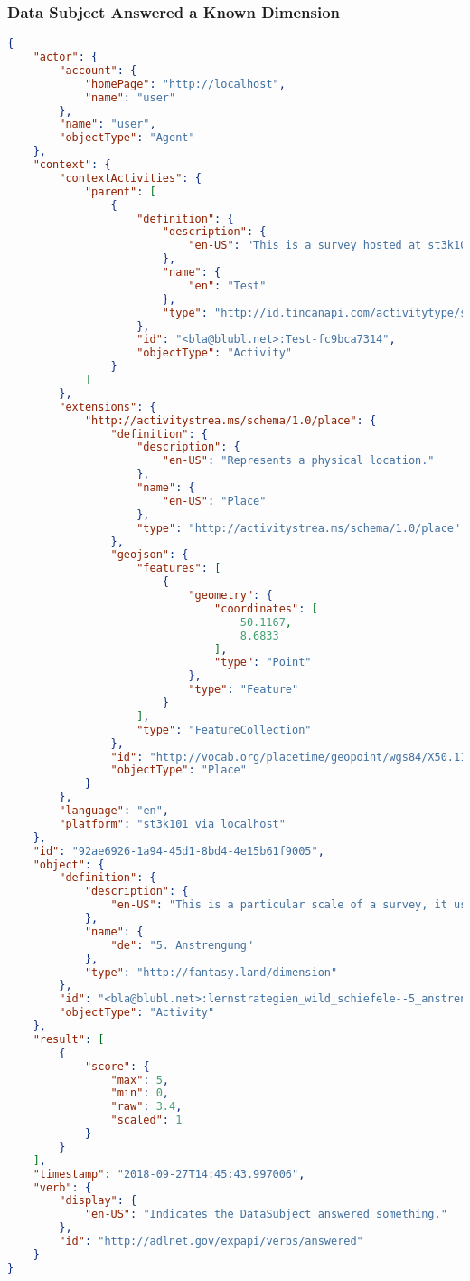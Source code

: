 \subsubsection*{Data Subject Answered a Known Dimension}
\begin{lstlisting}[language=JSON]
{
    "actor": {
        "account": {
            "homePage": "http://localhost",
            "name": "user"
        },
        "name": "user",
        "objectType": "Agent"
    },
    "context": {
        "contextActivities": {
            "parent": [
                {
                    "definition": {
                        "description": {
                            "en-US": "This is a survey hosted at st3k101."
                        },
                        "name": {
                            "en": "Test"
                        },
                        "type": "http://id.tincanapi.com/activitytype/survey"
                    },
                    "id": "<bla@blubl.net>:Test-fc9bca7314",
                    "objectType": "Activity"
                }
            ]
        },
        "extensions": {
            "http://activitystrea.ms/schema/1.0/place": {
                "definition": {
                    "description": {
                        "en-US": "Represents a physical location."
                    },
                    "name": {
                        "en-US": "Place"
                    },
                    "type": "http://activitystrea.ms/schema/1.0/place"
                },
                "geojson": {
                    "features": [
                        {
                            "geometry": {
                                "coordinates": [
                                    50.1167,
                                    8.6833
                                ],
                                "type": "Point"
                            },
                            "type": "Feature"
                        }
                    ],
                    "type": "FeatureCollection"
                },
                "id": "http://vocab.org/placetime/geopoint/wgs84/X50.1167Y8.6833.html",
                "objectType": "Place"
            }
        },
        "language": "en",
        "platform": "st3k101 via localhost"
    },
    "id": "92ae6926-1a94-45d1-8bd4-4e15b61f9005",
    "object": {
        "definition": {
            "description": {
                "en-US": "This is a particular scale of a survey, it usually contains multiple questions."
            },
            "name": {
                "de": "5. Anstrengung"
            },
            "type": "http://fantasy.land/dimension"
        },
        "id": "<bla@blubl.net>:lernstrategien_wild_schiefele--5_anstrengung",
        "objectType": "Activity"
    },
    "result": [
        {
            "score": {
                "max": 5,
                "min": 0,
                "raw": 3.4,
                "scaled": 1
            }
        }
    ],
    "timestamp": "2018-09-27T14:45:43.997006",
    "verb": {
        "display": {
            "en-US": "Indicates the DataSubject answered something."
        },
        "id": "http://adlnet.gov/expapi/verbs/answered"
    }
}
\end{lstlisting}


